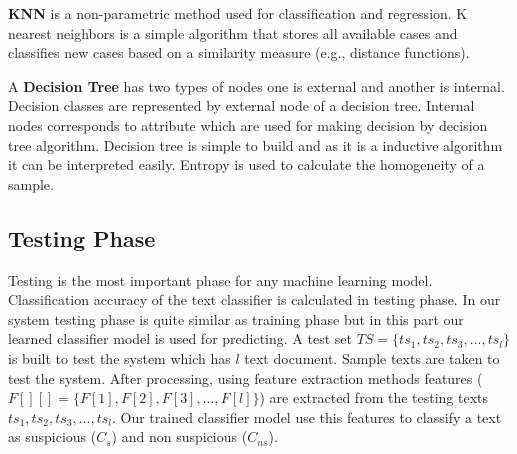 \vspace{0.3cm}
\textbf{KNN}\cite{harisinghaney2014text} is a non-parametric method used for
classification and regression. K nearest neighbors is a simple algorithm that stores all available cases and classifies new cases based on a similarity measure (e.g., distance functions).

\vspace{0.3cm}
A \textbf{Decision Tree}\cite{chavan2014survey} has two types of nodes one is external and another is internal. Decision classes are represented by external node of a decision tree. Internal nodes corresponds to attribute which are used for making decision by decision tree algorithm. Decision tree is simple to build and as it is a inductive algorithm it can be interpreted easily. Entropy is used to calculate the homogeneity of a sample.

\subsection{\textbf{Testing Phase}}
Testing is the most important phase for any machine learning model. Classification accuracy of the text classifier is calculated in testing phase. In our system testing phase is quite similar as training phase but in this part our learned classifier model is used for predicting. A test set $TS =\{ts_1, ts_2, ts_3, ..., ts_l\}$ is built to test the system which has $l$ text document. Sample texts are taken to test the system. After processing, using feature extraction methods features ($F[][]=\{F[1], F[2], F[3], ... ,F[l]\}$) are extracted from the testing texts $ts_1, ts_2, ts_3, ..., ts_l$. Our trained classifier model use this features to classify a text as suspicious ($C_s$) and non suspicious ($C_{ns}$).